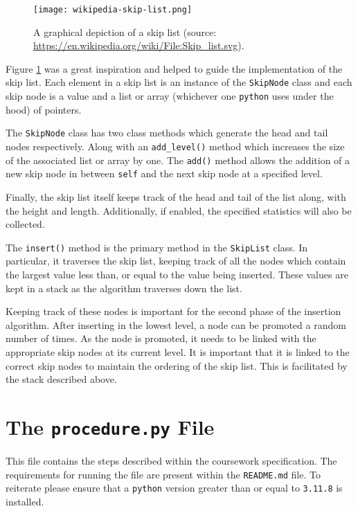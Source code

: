 \documentclass[article]{uom-coursework}
\begin{document}
\begin{figure}[H]
\centering
\texttt{[image: wikipedia-skip-list.png]}
\caption{A graphical depiction of a skip list (source: \url{https://en.wikipedia.org/wiki/File:Skip_list.svg}).}
\label{fig:imageskiplist}
\end{figure}

Figure \ref{fig:imageskiplist} was a great inspiration and
helped to guide the implementation of the skip list. Each
element in a skip list is an instance of the \texttt{SkipNode}
class and each skip node is a value and a list or array
(whichever one \texttt{python} uses under the hood) of pointers.

The \texttt{SkipNode} class has two class methods which generate
the head and tail nodes respectively. Along with an
\texttt{add\_level()} method which increases the size of the
associated list or array by one. The \texttt{add()} method
allows the addition of a new skip node in between \texttt{self}
and the next skip node at a specified level.

Finally, the skip list itself keeps track of the head and tail
of the list along, with the height and length. Additionally, if
enabled, the specified statistics will also be collected.

The \texttt{insert()} method is the primary method in the
\texttt{SkipList} class. In particular, it traverses the skip
list, keeping track of all the nodes which contain the largest
value less than, or equal to the value being inserted. These
values are kept in a stack as the algorithm traverses down the
list.

Keeping track of these nodes is important for the second phase
of the insertion algorithm. After inserting in the lowest level,
a node can be promoted a random number of times. As the node is
promoted, it needs to be linked with the appropriate skip nodes
at its current level. It is important that it is linked to the
correct skip nodes to maintain the ordering of the skip list.
This is facilitated by the stack described above.

\section{The \texttt{procedure.py} File}

This file contains the steps described within the coursework
specification. The requirements for running the file are present
within the \texttt{README.md} file. To reiterate please ensure
that a \texttt{python} version greater than or equal to
\texttt{3.11.8} is installed. 
\end{document}
